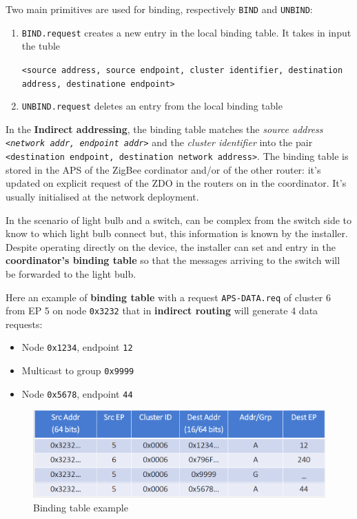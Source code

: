 \documentclass[10pt,a4paper]{report}
\theoremstyle{definition}
\begin{document}
Two main primitives are used for binding, respectively \texttt{BIND} and \texttt{UNBIND}:
\begin{enumerate}
	\item 
	\texttt{BIND.request} creates a new entry in the local binding table. It takes in input the tuble 
	\begin{center}
		\texttt{<source address, source endpoint, cluster identifier, destination address, destinatione endpoint>}
	\end{center}
	
	\item 
	\texttt{UNBIND.request} deletes an entry from the local binding table
\end{enumerate}

In the \textbf{Indirect addressing}, the binding table matches the \textit{source address \texttt{<network addr, endpoint addr>}} and the \textit{cluster identifier} into the pair \texttt{<destination endpoint, destination network address>}. The binding table is stored in the APS of the ZigBee cordinator and/or of the other router: it's updated on explicit request of the ZDO in the routers on in the coordinator. It's usually initialised at the network deployment.

In the scenario of light bulb and a switch, can be complex from the switch side to know to which light bulb connect but, this information is known by the installer. Despite operating directly on the device, the installer can set and entry in the \textbf{coordinator's binding table} so that the messages arriving to the switch will be forwarded to the light bulb.

Here an example of \textbf{binding table} with a request \texttt{APS-DATA.req} of cluster 6 from EP 5 on node \texttt{0x3232} that in \textbf{indirect routing} will generate 4 data requests:
\begin{itemize}
	\item 
	Node \texttt{0x1234}, endpoint \texttt{12}
	\item 
	Multicast to group \texttt{0x9999}
	\item 
	Node \texttt{0x5678}, endpoint \texttt{44}
\end{itemize}

\begin{figure}[h]
	\centering\includegraphics[scale=0.30]{images/Pasted image 20230311163416.png}
	\caption{Binding table example}
	\label{zigbee-binding-table}
\end{figure}
\end{document}
